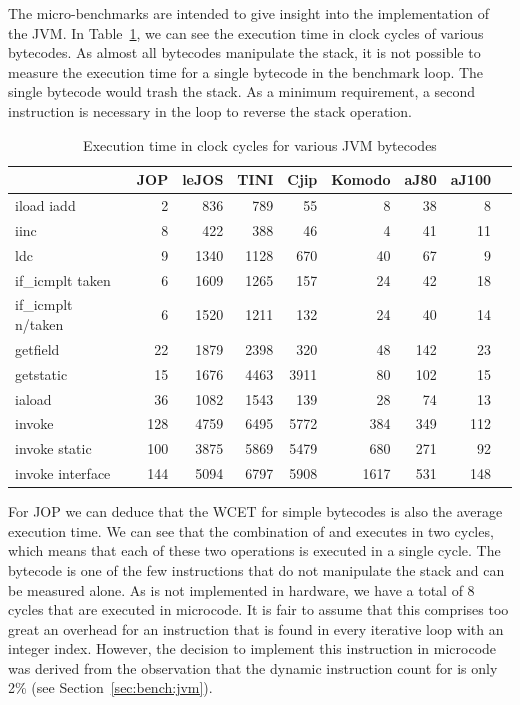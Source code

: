 The micro-benchmarks are intended to give insight into the
implementation of the JVM. In Table~\ref{tab:results:bench:clock},
we can see the execution time in clock cycles of various bytecodes.
As almost all bytecodes manipulate the stack, it is not possible to
measure the execution time for a single bytecode in the benchmark
loop. The single bytecode would trash the stack. As a minimum
requirement, a second instruction is necessary in the loop to
reverse the stack operation.

\begin{table}
    \centering
    \begin{tabular*}{\columnwidth}{@{\extracolsep{\fill}}lrrrrrrrr}
        \toprule

                      & JOP & leJOS & TINI  & Cjip & Komodo & aJ80 & aJ100 \\
        \midrule
    iload iadd         & 2 & 836 & 789      & 55 & 8 & 38 & 8 \\
    iinc               & 8 & 422 & 388      & 46 & 4 & 41 & 11 \\
    ldc                & 9 & 1340 & 1128  & 670 & 40 & 67 & 9 \\
    if\_icmplt taken   & 6 & 1609 & 1265  & 157 & 24 & 42 & 18 \\
    if\_icmplt n/taken & 6 & 1520 & 1211  & 132 & 24 & 40 & 14 \\
    getfield           & 22 & 1879 & 2398 & 320 & 48 & 142 & 23 \\
    getstatic          & 15 & 1676 & 4463 & 3911 & 80 & 102 & 15 \\
    iaload             & 36 & 1082 & 1543 & 139 & 28 & 74 & 13 \\
    invoke             & 128 & 4759 & 6495& 5772 & 384 & 349 & 112 \\
    invoke static      & 100 & 3875 & 5869& 5479 & 680 & 271 & 92 \\
    invoke interface   & 144 & 5094 & 6797& 5908 & 1617 & 531 & 148 \\

        \bottomrule
    \end{tabular*}
    \caption{Execution time in clock cycles for various JVM bytecodes}
    \label{tab:results:bench:clock}
\end{table}

For JOP we can deduce that the WCET for simple bytecodes  is also
the average execution time. We can see that the combination of
 and  executes in two cycles, which means
that each of these two operations is executed in a single cycle. The
 bytecode is one of the few instructions that do not
manipulate the stack and can be measured alone. As  is
not implemented in hardware, we have a total of 8 cycles that are
executed in microcode. It is fair to assume that this comprises too
great an overhead for an instruction that is found in every
iterative loop with an integer index. However, the decision to
implement this instruction in microcode was derived from the
observation that the dynamic instruction count for  is
only 2\% (see Section~\ref{sec:bench:jvm}).

